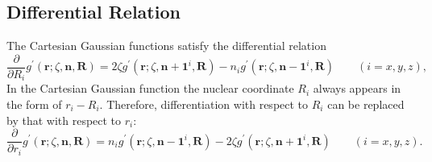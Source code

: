 \documentclass[11pt,a4paper]{article}
\begin{document}
	\subsection{Differential Relation}
	The Cartesian Gaussian functions satisfy the differential relation
	\begin{equation}
		\frac{\partial}{\partial R_i} g^{\prime}(\mathbf{r}; \zeta, \mathbf{n}, \mathbf{R}) = 2 \zeta g^{\prime}(\mathbf{r}; \zeta, \mathbf{n}+\mathbf{1}^i, \mathbf{R}) - n_i g^{\prime}(\mathbf{r}; \zeta, \mathbf{n}-\mathbf{1}^i, \mathbf{R}) \qquad (i = x,y,z),
		\label{eq: differential relation 1}
	\end{equation}
	In the Cartesian Gaussian function the nuclear coordinate $R_i$ always appears in the form of $r_i - R_i$. Therefore, differentiation with respect to $R_i$ can be replaced by that with respect to $r_i$:
	\begin{equation}
		\frac{\partial}{\partial r_i} g^{\prime}(\mathbf{r}; \zeta, \mathbf{n}, \mathbf{R}) = n_i g^{\prime}(\mathbf{r}; \zeta, \mathbf{n}-\mathbf{1}^i, \mathbf{R}) - 2 \zeta g^{\prime}(\mathbf{r}; \zeta, \mathbf{n}+\mathbf{1}^i, \mathbf{R}) \qquad (i = x,y,z).
		\label{eq: differential relation 2}
	\end{equation}
	
	
\end{document}
